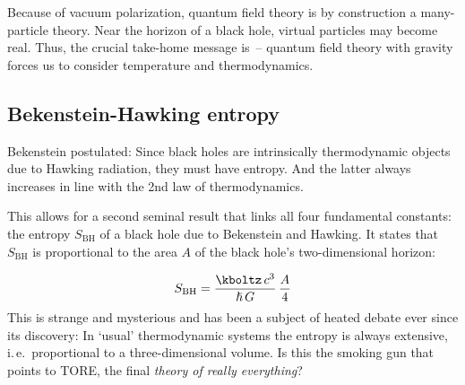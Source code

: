 \documentclass{scrartcl}
\begin{document}
Because of vacuum polarization, quantum field theory is by construction a many-particle theory. Near the horizon of a black hole, virtual particles may become real. Thus, the crucial take-home message is~-- quantum field theory with gravity forces us to consider temperature and thermodynamics.


\subsection*{Bekenstein-Hawking entropy}

Bekenstein postulated: Since black holes are intrinsically thermodynamic objects due to Hawking radiation, they must have entropy. And the latter always increases in line with the 2nd law of thermodynamics.

This allows for a second seminal result that links all four fundamental constants: the entropy $S_{\text{BH}}$ of a black hole due to Bekenstein and Hawking. It states that $S_{\text{BH}}$ is proportional to the area $A$ of the black hole's two-dimensional horizon:

\begin{equation*}
  S_{\text{BH}} = \frac{\kboltz\, c^3}{\hslash\, G}\, \frac{A}{4}
\end{equation*}
%
This is strange and mysterious and has been a subject of heated debate ever since its discovery: In \enquote*{usual} thermodynamic systems the entropy is always extensive, i.\,e.\ proportional to a three-dimensional volume. Is this the smoking gun that points to TORE, the final \emph{theory of really everything}? 
\end{document}
